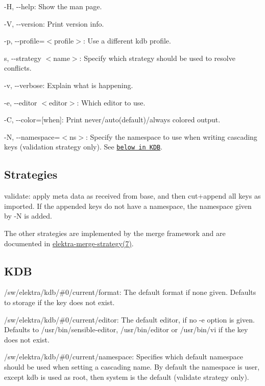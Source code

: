 \begin{DoxyItemize}
\item {\ttfamily -\/\+H}, {\ttfamily -\/-\/help}\+: Show the man page.
\item {\ttfamily -\/\+V}, {\ttfamily -\/-\/version}\+: Print version info.
\item {\ttfamily -\/p}, {\ttfamily -\/-\/profile}=$<$profile$>$\+: Use a different kdb profile.
\item {\ttfamily s}, {\ttfamily -\/-\/strategy $<$name$>$}\+: Specify which strategy should be used to resolve conflicts.
\item {\ttfamily -\/v}, {\ttfamily -\/-\/verbose}\+: Explain what is happening.
\item {\ttfamily -\/e}, {\ttfamily -\/-\/editor $<$editor$>$}\+: Which editor to use.
\item {\ttfamily -\/\+C}, {\ttfamily -\/-\/color}=\mbox{[}when\mbox{]}\+: Print never/auto(default)/always colored output.
\item {\ttfamily -\/\+N}, {\ttfamily -\/-\/namespace}=$<$ns$>$\+: Specify the namespace to use when writing cascading keys ({\ttfamily validation} strategy only). See \href{#KDB}{\tt below in K\+D\+B}.
\end{DoxyItemize}

\subsection*{Strategies}


\begin{DoxyItemize}
\item {\ttfamily validate}\+: apply meta data as received from base, and then cut+append all keys as imported. If the appended keys do not have a namespace, the namespace given by {\ttfamily -\/\+N} is added.
\end{DoxyItemize}

The other strategies are implemented by the merge framework and are documented in \hyperlink{md_doc_help_elektra-merge-strategy_doc_help_elektra-merge-strategy_md}{elektra-\/merge-\/strategy(7)}.

\subsection*{K\+D\+B}


\begin{DoxyItemize}
\item {\ttfamily /sw/elektra/kdb/\#0/current/format}\+: The default format if none given. Defaults to {\ttfamily storage} if the key does not exist.
\item {\ttfamily /sw/elektra/kdb/\#0/current/editor}\+: The default editor, if no {\ttfamily -\/e} option is given. Defaults to {\ttfamily /usr/bin/sensible-\/editor}, {\ttfamily /usr/bin/editor} or {\ttfamily /usr/bin/vi} if the key does not exist.
\item {\ttfamily /sw/elektra/kdb/\#0/current/namespace}\+: Specifies which default namespace should be used when setting a cascading name. By default the namespace is user, except {\ttfamily kdb} is used as root, then {\ttfamily system} is the default ({\ttfamily validate} strategy only).
\end{DoxyItemize}

